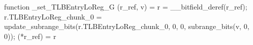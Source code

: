 function _set_TLBEntryLoReg_G (r_ref, v) = {
    r = __bitfield_deref(r_ref);
    r.TLBEntryLoReg_chunk_0 = update_subrange_bits(r.TLBEntryLoReg_chunk_0, 0, 0, subrange_bits(v, 0, 0));
    (*r_ref) = r
}
